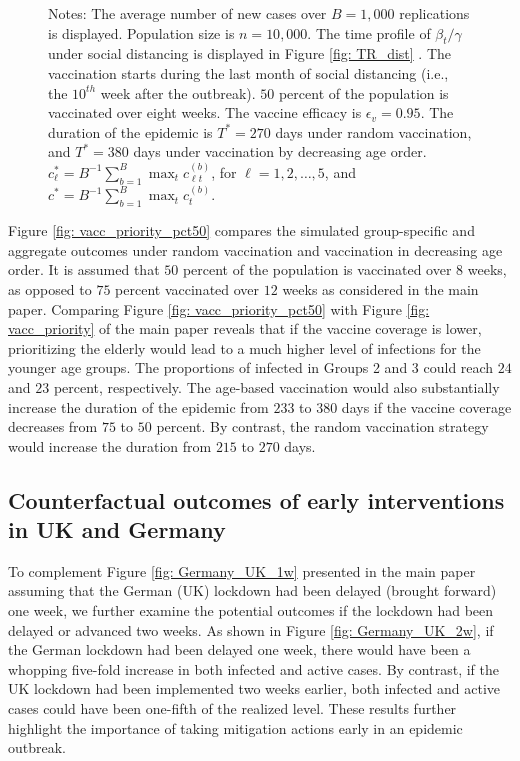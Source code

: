 \documentclass[12pt]{article}
\begin{document}
\begin{figure}[hp]
\begin{center}
\end{center}

%

\vspace{-0.2cm}%
Notes: The average number of new cases over $B=1,000$ replications is
displayed. Population size is $n=10,000$. The time profile of $\beta
_{t}/\gamma$ under social distancing is displayed in Figure \ref{fig: TR_dist}%
. The vaccination starts during the last month of social distancing (i.e., the
$10^{th}$ week after the outbreak). $50$ percent of the population is
vaccinated over eight weeks. The vaccine efficacy is $\epsilon_{v}=0.95.$ The
duration of the epidemic is $T^{\ast}=270$ days under random vaccination, and
$T^{\ast}=380$ days under vaccination by decreasing age order$.$ $c_{\ell
}^{\ast}=B^{-1}\sum_{b=1}^{B}\max_{t}c_{\ell t}^{(b)}$, for $\ell
=1,2,\ldots,5$, and $c^{\ast}=B^{-1}\sum_{b=1}^{B}\max_{t}c_{t}^{(b)}.$%

\end{figure}%


Figure \ref{fig: vacc_priority_pct50} compares the simulated group-specific
and aggregate outcomes under random vaccination and vaccination in decreasing
age order. It is assumed that $50$ percent of the population is vaccinated
over $8$ weeks, as opposed to $75$ percent vaccinated over $12$ weeks as
considered in the main paper. Comparing Figure \ref{fig: vacc_priority_pct50}
with Figure \ref{fig: vacc_priority} of the main paper reveals that if the
vaccine coverage is lower, prioritizing the elderly would lead to a much
higher level of infections for the younger age groups. The proportions of
infected in Groups 2 and 3 could reach $24$ and $23$ percent, respectively.
The age-based vaccination would also substantially increase the duration of
the epidemic from $233$ to $380$ days if the vaccine coverage decreases from
$75$ to $50$ percent. By contrast, the random vaccination strategy would
increase the duration from $215$ to $270$ days.

\subsection{Counterfactual outcomes of early interventions in UK and Germany}

To complement Figure \ref{fig: Germany_UK_1w} presented in the main paper
assuming that the German (UK) lockdown had been delayed (brought forward) one
week, we further examine the potential outcomes if the lockdown had been
delayed or advanced two weeks. As shown in Figure \ref{fig: Germany_UK_2w}, if
the German lockdown had been delayed one week, there would have been a
whopping five-fold increase in both infected and active cases. By contrast, if
the UK lockdown had been implemented two weeks earlier, both infected and
active cases could have been one-fifth of the realized level. These results
further highlight the importance of taking mitigation actions early in an
epidemic outbreak.%
\end{document}
